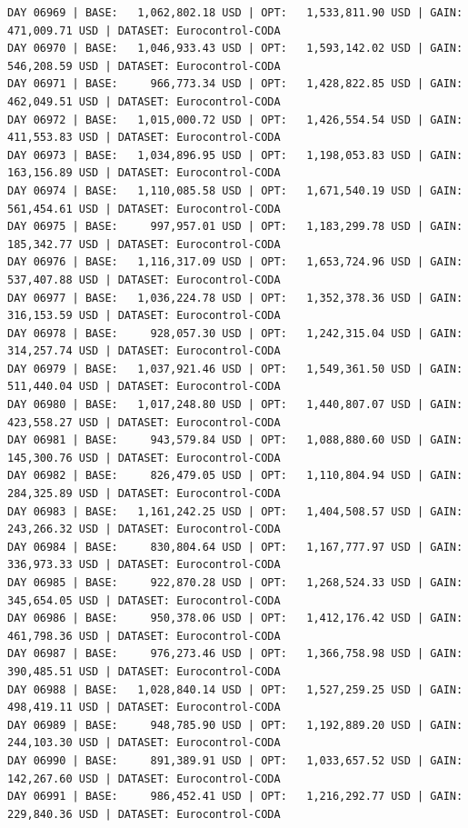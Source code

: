 \documentclass[11pt,a4paper]{article}
\begin{document}
\begin{verbatim}
DAY 06969 | BASE:   1,062,802.18 USD | OPT:   1,533,811.90 USD | GAIN: 471,009.71 USD | DATASET: Eurocontrol-CODA
DAY 06970 | BASE:   1,046,933.43 USD | OPT:   1,593,142.02 USD | GAIN: 546,208.59 USD | DATASET: Eurocontrol-CODA
DAY 06971 | BASE:     966,773.34 USD | OPT:   1,428,822.85 USD | GAIN: 462,049.51 USD | DATASET: Eurocontrol-CODA
DAY 06972 | BASE:   1,015,000.72 USD | OPT:   1,426,554.54 USD | GAIN: 411,553.83 USD | DATASET: Eurocontrol-CODA
DAY 06973 | BASE:   1,034,896.95 USD | OPT:   1,198,053.83 USD | GAIN: 163,156.89 USD | DATASET: Eurocontrol-CODA
DAY 06974 | BASE:   1,110,085.58 USD | OPT:   1,671,540.19 USD | GAIN: 561,454.61 USD | DATASET: Eurocontrol-CODA
DAY 06975 | BASE:     997,957.01 USD | OPT:   1,183,299.78 USD | GAIN: 185,342.77 USD | DATASET: Eurocontrol-CODA
DAY 06976 | BASE:   1,116,317.09 USD | OPT:   1,653,724.96 USD | GAIN: 537,407.88 USD | DATASET: Eurocontrol-CODA
DAY 06977 | BASE:   1,036,224.78 USD | OPT:   1,352,378.36 USD | GAIN: 316,153.59 USD | DATASET: Eurocontrol-CODA
DAY 06978 | BASE:     928,057.30 USD | OPT:   1,242,315.04 USD | GAIN: 314,257.74 USD | DATASET: Eurocontrol-CODA
DAY 06979 | BASE:   1,037,921.46 USD | OPT:   1,549,361.50 USD | GAIN: 511,440.04 USD | DATASET: Eurocontrol-CODA
DAY 06980 | BASE:   1,017,248.80 USD | OPT:   1,440,807.07 USD | GAIN: 423,558.27 USD | DATASET: Eurocontrol-CODA
DAY 06981 | BASE:     943,579.84 USD | OPT:   1,088,880.60 USD | GAIN: 145,300.76 USD | DATASET: Eurocontrol-CODA
DAY 06982 | BASE:     826,479.05 USD | OPT:   1,110,804.94 USD | GAIN: 284,325.89 USD | DATASET: Eurocontrol-CODA
DAY 06983 | BASE:   1,161,242.25 USD | OPT:   1,404,508.57 USD | GAIN: 243,266.32 USD | DATASET: Eurocontrol-CODA
DAY 06984 | BASE:     830,804.64 USD | OPT:   1,167,777.97 USD | GAIN: 336,973.33 USD | DATASET: Eurocontrol-CODA
DAY 06985 | BASE:     922,870.28 USD | OPT:   1,268,524.33 USD | GAIN: 345,654.05 USD | DATASET: Eurocontrol-CODA
DAY 06986 | BASE:     950,378.06 USD | OPT:   1,412,176.42 USD | GAIN: 461,798.36 USD | DATASET: Eurocontrol-CODA
DAY 06987 | BASE:     976,273.46 USD | OPT:   1,366,758.98 USD | GAIN: 390,485.51 USD | DATASET: Eurocontrol-CODA
DAY 06988 | BASE:   1,028,840.14 USD | OPT:   1,527,259.25 USD | GAIN: 498,419.11 USD | DATASET: Eurocontrol-CODA
DAY 06989 | BASE:     948,785.90 USD | OPT:   1,192,889.20 USD | GAIN: 244,103.30 USD | DATASET: Eurocontrol-CODA
DAY 06990 | BASE:     891,389.91 USD | OPT:   1,033,657.52 USD | GAIN: 142,267.60 USD | DATASET: Eurocontrol-CODA
DAY 06991 | BASE:     986,452.41 USD | OPT:   1,216,292.77 USD | GAIN: 229,840.36 USD | DATASET: Eurocontrol-CODA

\end{verbatim}
\end{document}
